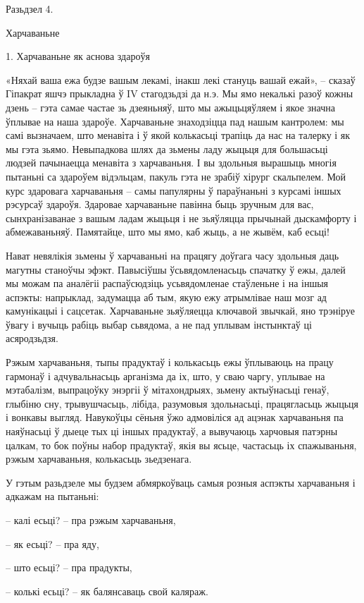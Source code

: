Разьдзел 4. 

Харчаваньне


1. Харчаваньне як аснова здароўя

«Няхай ваша ежа будзе вашым лекамі, інакш лекі стануць вашай ежай», – сказаў Гіпакрат яшчэ прыкладна ў IV стагодзьдзі да н.э. Мы ямо некалькі разоў кожны дзень – гэта самае частае зь дзеяньняў, што мы ажыцьцяўляем і якое значна ўплывае на наша здароўе. Харчаваньне знаходзіцца пад нашым кантролем: мы самі вызначаем, што менавіта і ў якой колькасьці трапіць да нас на талерку і як мы гэта зьямо. Невыпадкова шлях да зьмены ладу жыцьця для большасьці людзей пачынаецца менавіта з харчаваньня. І вы здольныя вырашыць многія пытаньні са здароўем відэльцам, пакуль гэта не зрабіў хірург скальпелем. Мой курс здаровага харчаваньня – самы папулярны ў параўнаньні з курсамі іншых рэсурсаў здароўя. Здаровае харчаваньне павінна быць зручным для вас, сынхранізаванае з вашым ладам жыцьця і не зьяўляцца прычынай дыскамфорту і абмежаваньняў. Памятайце, што мы ямо, каб жыць, а не жывём, каб есьці!

Нават невялікія зьмены ў харчаваньні на працягу доўгага часу здольныя даць магутны станоўчы эфэкт. Павысіўшы ўсьвядомленасьць спачатку ў ежы, далей мы можам па аналёгіі распаўсюдзіць усьвядомленае стаўленьне і на іншыя аспэкты: напрыклад, задумацца аб тым, якую ежу атрымлівае наш мозг ад камунікацыі і сацсетак. Харчаваньне зьяўляецца ключавой звычкай, яно трэніруе ўвагу і вучыць рабіць выбар сьвядома, а не пад уплывам інстынктаў ці асяродзьдзя.

Рэжым харчаваньня, тыпы прадуктаў і колькасьць ежы ўплываюць на працу гармонаў і адчувальнасьць арганізма да іх, што, у сваю чаргу, уплывае на мэтабалізм, выпрацоўку энэргіі ў мітахондрыях, зьмену актыўнасьці генаў, глыбіню сну, трывушчасьць, лібіда, разумовыя здольнасьці, працягласьць жыцьця і вонкавы выгляд. Навукоўцы сёньня ўжо адмовіліся ад ацэнак харчаваньня па наяўнасьці ў дыеце тых ці іншых прадуктаў, а вывучаюць харчовыя патэрны цалкам, то бок поўны набор прадуктаў, якія вы ясьце, частасьць іх спажываньня, рэжым харчаваньня, колькасьць зьедзенага.

У гэтым разьдзеле мы будзем абмяркоўваць самыя розныя аспэкты харчаваньня і адкажам на пытаньні: 

– калі есьці? – пра рэжым харчаваньня,

– як есьці? – пра яду,

– што есьці? – пра прадукты,

– колькі есьці? – як балянсаваць свой каляраж.

